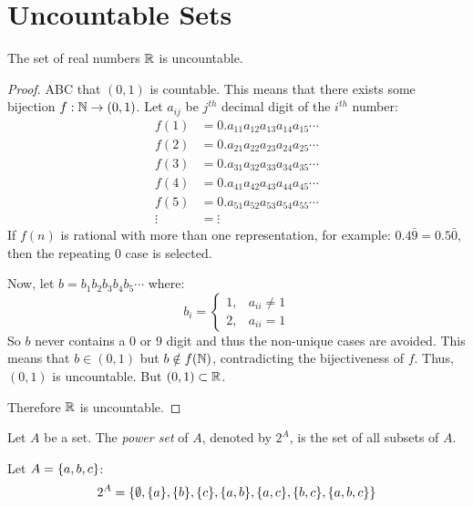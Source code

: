\documentclass[letterpaper,12pt,fleqn]{article}
\begin{document}
\section*{Uncountable Sets}

\begin{theorem}
  The set of real numbers \(\mathbb{R}\) is uncountable.
\end{theorem}

\begin{proof}
  ABC that \((0,1)\) is countable.  This means that there exists some bijection \(f:\mathbb{N}\to(0,1)\).  Let \(a_{ij}\)
  be \(j^{th}\) decimal digit of the \(i^{th}\) number:
  \begin{align*}
    f(1) &= 0.a_{11}a_{12}a_{13}a_{14}a_{15}\cdots \\
    f(2) &= 0.a_{21}a_{22}a_{23}a_{24}a_{25}\cdots \\
    f(3) &= 0.a_{31}a_{32}a_{33}a_{34}a_{35}\cdots \\
    f(4) &= 0.a_{41}a_{42}a_{43}a_{44}a_{45}\cdots \\
    f(5) &= 0.a_{51}a_{52}a_{53}a_{54}a_{55}\cdots \\
    \vdots &= \vdots
  \end{align*}
  If \(f(n)\) is rational with more than one representation, for example: \(0.4\bar{9}=0.5\bar{0}\), then the
  repeating \(0\) case is selected.

  Now, let \(b=b_1b_2b_3b_4b_5\cdots\) where:
  \[b_i=\begin{cases}
  1, & a_{ii}\ne1 \\
  2, & a_{ii}=1
  \end{cases}\]
  So \(b\) never contains a \(0\) or \(9\) digit and thus the non-unique cases are avoided.  This means that
  \(b\in(0,1)\) but \(b\notin f(\mathbb{N})\), contradicting the bijectiveness of \(f\).  Thus, \((0,1)\) is uncountable.
  But \((0,1)\subset\mathbb{R}\).

  Therefore \(\mathbb{R}\) is uncountable.
\end{proof}

\begin{definition}
  Let \(A\) be a set.  The \emph{power set} of \(A\), denoted by \(2^A\), is the set of all subsets of \(A\).
\end{definition}

\begin{example}
  Let \(A=\{a,b,c\}\):
  \[2^A=\{\emptyset,\{a\},\{b\},\{c\},\{a,b\},\{a,c\},\{b,c\},\{a,b,c\}\}\]
\end{example}
\end{document}

